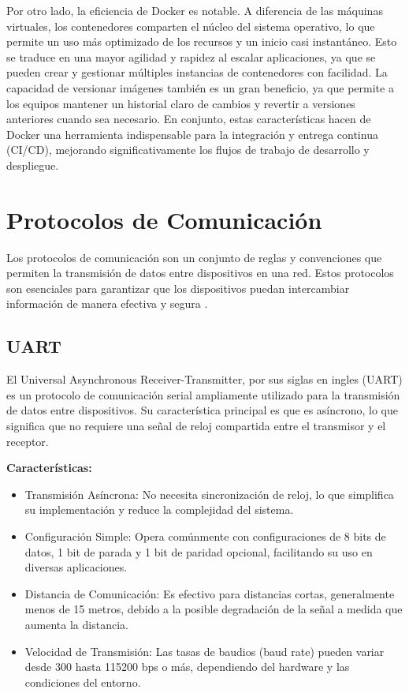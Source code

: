Por otro lado, la eficiencia de Docker es notable. A diferencia de las máquinas virtuales, los contenedores comparten el núcleo del sistema operativo, lo que permite un uso más optimizado de los recursos y un inicio casi instantáneo. Esto se traduce en una mayor agilidad y rapidez al escalar aplicaciones, ya que se pueden crear y gestionar múltiples instancias de contenedores con facilidad. La capacidad de versionar imágenes también es un gran beneficio, ya que permite a los equipos mantener un historial claro de cambios y revertir a versiones anteriores cuando sea necesario. En conjunto, estas características hacen de Docker una herramienta indispensable para la integración y entrega continua (CI/CD), mejorando significativamente los flujos de trabajo de desarrollo y despliegue.

\section{Protocolos de Comunicación}\label{sec:protocolos_de_comunicacion}

Los protocolos de comunicación son un conjunto de reglas y convenciones que permiten la transmisión de datos entre dispositivos en una red. Estos protocolos son esenciales para garantizar que los dispositivos puedan intercambiar información de manera efectiva y segura \cite{Eterovic2018AnlisisDP}.

\subsection{UART}

El Universal Asynchronous Receiver-Transmitter, por sus siglas en ingles (UART) es un protocolo de comunicación serial ampliamente utilizado para la transmisión de datos entre dispositivos. Su característica principal es que es asíncrono, lo que significa que no requiere una señal de reloj compartida entre el transmisor y el receptor.

\textbf{Características:}

\begin{itemize}
    \item Transmisión Asíncrona: No necesita sincronización de reloj, lo que simplifica su implementación y reduce la complejidad del sistema.
    \item Configuración Simple: Opera comúnmente con configuraciones de 8 bits de datos, 1 bit de parada y 1 bit de paridad opcional, facilitando su uso en diversas aplicaciones.
    \item Distancia de Comunicación: Es efectivo para distancias cortas, generalmente menos de 15 metros, debido a la posible degradación de la señal a medida que aumenta la distancia.
    \item Velocidad de Transmisión: Las tasas de baudios (baud rate) pueden variar desde 300 hasta 115200 bps o más, dependiendo del hardware y las condiciones del entorno.
\end{itemize}

